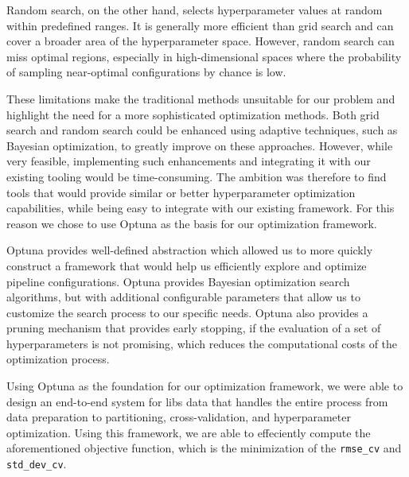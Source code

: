 Random search, on the other hand, selects hyperparameter values at random within predefined ranges. 
It is generally more efficient than grid search and can cover a broader area of the hyperparameter space. 
However, random search can miss optimal regions, especially in high-dimensional spaces where the probability of sampling near-optimal configurations by chance is low. 

These limitations make the traditional methods unsuitable for our problem and highlight the need for a more sophisticated optimization methods.
Both grid search and random search could be enhanced using adaptive techniques, such as Bayesian optimization, to greatly improve on these approaches.
However, while very feasible, implementing such enhancements and integrating it with our existing tooling would be time-consuming.
The ambition was therefore to find tools that would provide similar or better hyperparameter optimization capabilities, while being easy to integrate with our existing framework.
For this reason we chose to use Optuna as the basis for our optimization framework.

Optuna provides well-defined abstraction which allowed us to more quickly construct a framework that would help us efficiently explore and optimize pipeline configurations.\cite{optuna_2019}
Optuna provides Bayesian optimization search algorithms, but with additional configurable parameters that allow us to customize the search process to our specific needs.
Optuna also provides a pruning mechanism that provides early stopping, if the evaluation of a set of hyperparameters is not promising, which reduces the computational costs of the optimization process.

Using Optuna as the foundation for our optimization framework, we were able to design an end-to-end system for \gls{libs} data that handles the entire process from data preparation to partitioning, cross-validation, and hyperparameter optimization.
Using this framework, we are able to effeciently compute the aforementioned objective function, which is the minimization of the \texttt{rmse\_cv} and \texttt{std\_dev\_cv}.

